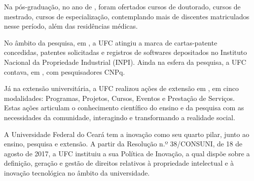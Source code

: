 Na pós-graduação, no ano de \ufcAnoReferencia, foram ofertados \ufcCurDoutorado cursos de doutorado, \ufcCurMestrado cursos de mestrado, \ufcCurEspecializacao cursos de especialização, contemplando mais de \ufcDiscentesPos discentes matriculados nesse período, além das \ufcResidMedica residências médicas. 

No âmbito da pesquisa, em \ufcAnoReferencia, a UFC atingiu a marca de \ufcCartaPatente cartas-patente concedidas, \ufcPedidoPatente patentes solicitadas e \ufcRegSoftware registros de softwares depositados no Instituto Nacional da Propriedade Industrial (INPI). Ainda na esfera da pesquisa, a UFC contava, em \ufcAnoReferencia, com \ufcPesqCNPQ pesquisadores CNPq. 

Já na extensão universitária, a UFC realizou \ufcAcoesExtensao ações de extensão em \ufcAnoReferencia, em cinco modalidades: Programas, Projetos, Cursos, Eventos e Prestação de Serviços. Estas ações articulam o conhecimento científico do ensino e da pesquisa com as necessidades da comunidade, interagindo e transformando a realidade social.

A Universidade Federal do Ceará tem a inovação como seu quarto pilar, junto ao ensino, pesquisa e extensão. A partir da Resolução n.º 38/CONSUNI, de 18 de agosto de 2017, a UFC instituiu a sua Política de Inovação, a qual dispõe sobre a definição, geração e gestão de direitos relativos à propriedade intelectual e à inovação tecnológica no âmbito da universidade. 

